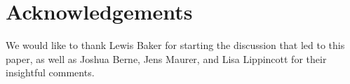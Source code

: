 

\section*{Acknowledgements}
We would like to thank Lewis Baker for starting the discussion that led to this paper, as well as Joshua Berne, Jens Maurer, and Lisa Lippincott for their insightful comments.

\renewcommand{\bibname}{References}




